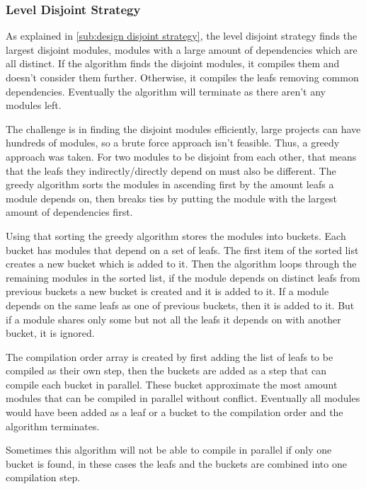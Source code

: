 \subsubsection{Level Disjoint Strategy} \label{sub:imp disj strategy}

As explained in \cref{sub:design disjoint strategy}, the level disjoint
strategy finds the largest disjoint modules, modules with a large amount of
dependencies which are all distinct. If the algorithm finds the disjoint
modules, it compiles them and doesn't consider them further. Otherwise, it
compiles the leafs removing common dependencies. Eventually the algorithm will
terminate as there aren't any modules left.

The challenge is in finding the disjoint modules efficiently, large projects
can have hundreds of modules, so a brute force approach isn't feasible. Thus, a
greedy approach was taken. For two modules to be disjoint from each other, that
means that the leafs they indirectly/directly depend on must also be different.
The greedy algorithm sorts the modules in ascending first by the amount leafs a
module depends on, then breaks ties by putting the module with the largest
amount of  dependencies first.

Using that sorting the greedy algorithm stores the modules into buckets. Each
bucket has modules that depend on a set of leafs. The first item of the sorted
list creates a new bucket which is added to it. Then the algorithm loops through
the remaining modules in the sorted list, if the module depends on distinct leafs
from previous buckets a new bucket is created and it is added to it. If a
module depends on the same leafs as one of previous buckets, then it is added to it.
But if a module shares only some but not all the leafs it depends on with
another bucket, it is ignored.

The compilation order array is created by first adding the list of leafs to be
compiled as their own step, then the buckets are added as a step that can
compile each bucket in parallel. These bucket approximate the most amount
modules that can be compiled in parallel without conflict. Eventually all
modules would have been added as a leaf or a bucket to the compilation order
and the algorithm terminates.

Sometimes this algorithm will not be able to compile in parallel if only one
bucket is found, in these cases the leafs and the buckets are combined into one
compilation step.

